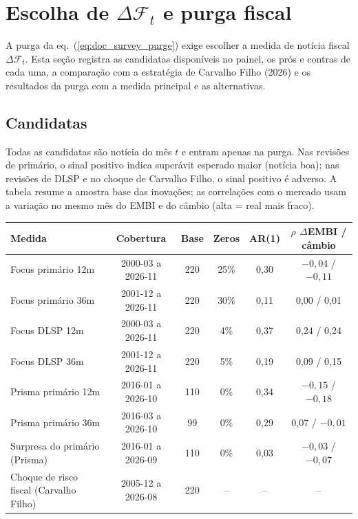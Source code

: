 \documentclass[12pt,a4paper]{article}
\begin{document}
\section{Escolha de \texorpdfstring{\(\Delta\mathcal{F}_t\)}{Delta F} e purga fiscal}\label{sec:purga}

A purga da eq.~(\ref{eq:doc_survey_purge}) exige escolher a medida de notícia fiscal
\(\Delta\mathcal{F}_t\). Esta seção registra as candidatas disponíveis no painel, os
prós e contras de cada uma, a comparação com a estratégia de Carvalho Filho (2026) e
os resultados da purga com a medida principal e as alternativas.

\subsection{Candidatas}

Todas as candidatas são notícia do mês \(t\) e entram apenas na purga. Nas revisões
de primário, o sinal positivo indica superávit esperado maior (notícia boa); nas
revisões de DLSP e no choque de Carvalho Filho, o sinal positivo é adverso. A tabela
resume a amostra base das inovações; as correlações com o mercado usam a variação no
mesmo mês do EMBI e do câmbio (alta = real mais fraco).

\begin{center}
\footnotesize
\begin{tabular}{p{}ccccc}
\toprule
Medida & Cobertura & Base & Zeros & AR(1) & \(\rho\) \(\Delta\)EMBI / câmbio \\
\midrule
Focus primário 12m & 2000-03 a 2026-11 & 220 & 25\% & 0,30 & \(-0{,}04\) / \(-0{,}11\) \\
Focus primário 36m & 2001-12 a 2026-11 & 220 & 30\% & 0,11 & 0,00 / 0,01 \\
Focus DLSP 12m & 2000-03 a 2026-11 & 220 & 4\% & 0,37 & 0,24 / 0,24 \\
Focus DLSP 36m & 2001-12 a 2026-11 & 220 & 5\% & 0,19 & 0,09 / 0,15 \\
Prisma primário 12m & 2016-01 a 2026-10 & 110 & 0\% & 0,34 & \(-0{,}15\) / \(-0{,}18\) \\
Prisma primário 36m & 2016-03 a 2026-10 & 99 & 0\% & 0,29 & 0,07 / \(-0{,}01\) \\
Surpresa do primário (Prisma) & 2016-01 a 2026-09 & 110 & 0\% & 0,03 & \(-0{,}03\) / \(-0{,}07\) \\
Choque de risco fiscal (Carvalho Filho) & 2005-12 a 2026-08 & 220 & -- & -- & -- \\
\bottomrule
\end{tabular}
\end{center}
\end{document}
